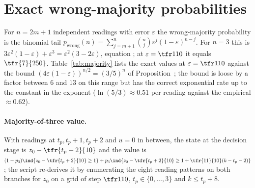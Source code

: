 \section{Exact wrong-majority probabilities}\label{si:majority}

For $n=2m+1$ independent readings with error $\varepsilon$ the wrong-majority probability is the binomial tail $p_{\mathrm{wrong}}(n)=\sum_{j=m+1}^{n}\binom nj\varepsilon^{j}(1-\varepsilon)^{n-j}$. For $n=3$ this is $3\varepsilon^2(1-\varepsilon)+\varepsilon^3=\varepsilon^2(3-2\varepsilon)$, equation ; at $\varepsilon=\tfr1{10}$ it equals $\tfr{7}{250}$. Table~\ref{tab:majority} lists the exact values at $\varepsilon=\tfr1{10}$ against the bound $(4\varepsilon(1-\varepsilon))^{n/2}=(3/5)^n$ of Proposition~; the bound is loose by a factor between $6$ and $13$ on this range but has the correct exponential rate up to the constant in the exponent ($\ln(5/3)\approx0.51$ per reading against the empirical $\approx0.62$).

\begin{table}[h]
\centering\footnotesize
\caption{Exact wrong-majority probabilities at $\varepsilon=\tfr1{10}$ and the bound $(3/5)^n$.}
\label{tab:majority}

\end{table}

\paragraph{Majority-of-three value.} With readings at $t_p,t_p+1,t_p+2$ and $u=0$ in between, the state at the decision stage is $z_0-\tfr{t_p+2}{10}$ and the value is $(1-p_3)\ind{z_0-\tfr{t_p+2}{10}\ge1}+p_3\ind{z_0-\tfr{t_p+2}{10}\ge1+\tfr{11}{10}(k-t_p-2)}$; the script re-derives it by enumerating the eight reading patterns on both branches for $z_0$ on a grid of step $\tfr1{10}$, $t_p\in\{0,\dots,3\}$ and $k\le t_p+8$.
